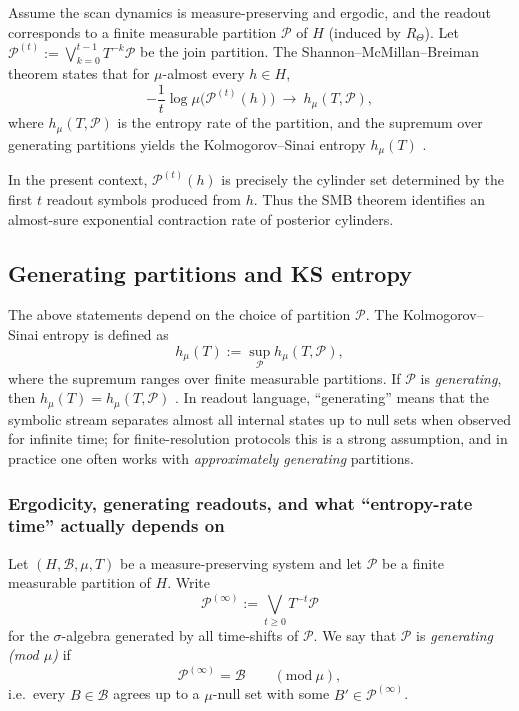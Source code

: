 Assume the scan dynamics is measure-preserving and ergodic, and the readout corresponds to a finite measurable partition $\mathcal{P}$ of $H$ (induced by $R_\Theta$). Let $\mathcal{P}^{(t)} := \bigvee_{k=0}^{t-1} T^{-k}\mathcal{P}$ be the join partition. The Shannon--McMillan--Breiman theorem states that for $\mu$-almost every $h\in H$,
\[
-\frac{1}{t}\log \mu\bigl(\mathcal{P}^{(t)}(h)\bigr)\ \longrightarrow\ h_\mu(T,\mathcal{P}),
\]
where $h_\mu(T,\mathcal{P})$ is the entropy rate of the partition, and the supremum over generating partitions yields the Kolmogorov--Sinai entropy $h_\mu(T)$ \cite{Walters1982,Petersen1983,KatokHasselblatt1995}.

In the present context, $\mathcal{P}^{(t)}(h)$ is precisely the cylinder set determined by the first $t$ readout symbols produced from $h$. Thus the SMB theorem identifies an almost-sure exponential contraction rate of posterior cylinders.

\subsection{Generating partitions and KS entropy}\label{sec:info-time:ks}

The above statements depend on the choice of partition $\mathcal{P}$. The Kolmogorov--Sinai entropy is defined as
\[
h_\mu(T):=\sup_{\mathcal{P}} h_\mu(T,\mathcal{P}),
\]
where the supremum ranges over finite measurable partitions. If $\mathcal{P}$ is \emph{generating}, then $h_\mu(T)=h_\mu(T,\mathcal{P})$ \cite{Walters1982,Petersen1983,KatokHasselblatt1995}. In readout language, ``generating'' means that the symbolic stream separates almost all internal states up to null sets when observed for infinite time; for finite-resolution protocols this is a strong assumption, and in practice one often works with \emph{approximately generating} partitions.

\subsubsection{Ergodicity, generating readouts, and what ``entropy-rate time'' actually depends on}\label{sec:info-time:generating-meaning}

\begin{definition}\label{def:generating-partition}
Let $(H,\mathcal{B},\mu,T)$ be a measure-preserving system and let $\mathcal{P}$ be a finite measurable partition of $H$.
Write
\[
\mathcal{P}^{(\infty)}:=\bigvee_{t\ge 0} T^{-t}\mathcal{P}
\]
for the \(\sigma\)-algebra generated by all time-shifts of \(\mathcal{P}\).
We say that \(\mathcal{P}\) is \emph{generating (mod \(\mu\))} if
\[
\mathcal{P}^{(\infty)}=\mathcal{B}\qquad (\mathrm{mod}\ \mu),
\]
i.e.\ every \(B\in\mathcal{B}\) agrees up to a \(\mu\)-null set with some \(B'\in\mathcal{P}^{(\infty)}\).
\end{definition}


